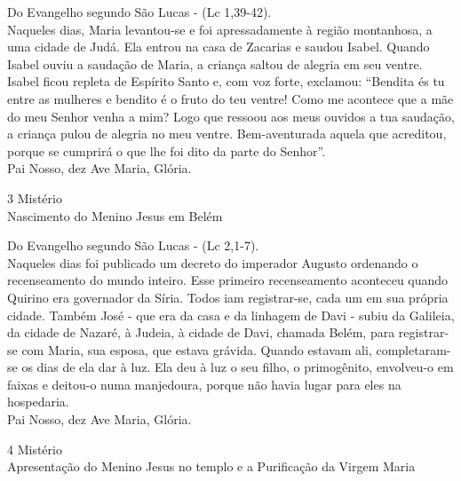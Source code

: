 \begin{flushleft}
    Do Evangelho segundo São Lucas - (\textcolor{VioletRed3}{Lc 1,39-42}). \\
    \hfill{} \break{}
    Naqueles dias, Maria levantou-se e foi apressadamente à região montanhosa, a uma cidade de Judá. Ela entrou na casa de Zacarias e saudou Isabel. Quando Isabel ouviu a saudação de Maria, a criança saltou de alegria em seu ventre. Isabel ficou repleta de Espírito Santo e, com voz forte, exclamou: ``Bendita és tu entre as mulheres e bendito é o fruto do teu ventre! Como me acontece que a mãe do meu Senhor venha a mim? Logo que ressoou aos meus ouvidos a tua saudação, a criança pulou de alegria no meu ventre. Bem-aventurada aquela que acreditou, porque se cumprirá o que lhe foi dito da parte do Senhor''. \\
    \hfill{} \break{}
    Pai Nosso, dez Ave Maria, Glória.
\end{flushleft}
\begin{center}
    3\textordmasculine{} Mistério \\ Nascimento do Menino Jesus em Belém
\end{center}
\begin{flushleft}
    Do Evangelho segundo São Lucas - (\textcolor{VioletRed3}{Lc 2,1-7}). \\
    \hfill{} \break{}
    Naqueles dias foi publicado um decreto do imperador Augusto ordenando o recenseamento do mundo inteiro. Esse primeiro recenseamento aconteceu quando Quirino era governador da Síria. Todos iam registrar-se, cada um em sua própria cidade. Também José - que era da casa e da linhagem de Davi - subiu da Galileia, da cidade de Nazaré, à Judeia, à cidade de Davi, chamada Belém, para registrar-se com Maria, sua esposa, que estava grávida. Quando estavam ali, completaram-se os dias de ela dar à luz. Ela deu à luz o seu filho, o primogênito, envolveu-o em faixas e deitou-o numa manjedoura, porque não havia lugar para eles na hospedaria. \\
    \hfill{} \break{}
    Pai Nosso, dez Ave Maria, Glória.
\end{flushleft}
\newpage
\begin{center}
    4\textordmasculine{} Mistério \\ Apresentação do Menino Jesus no templo e a Purificação da Virgem Maria
\end{center}
